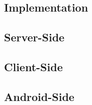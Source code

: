 \begin{CJK}{Bg5}{bsmi}

\chapter{Implementation}

\section{Server-Side}

\section{Client-Side}

\section{Android-Side}

\end{CJK}